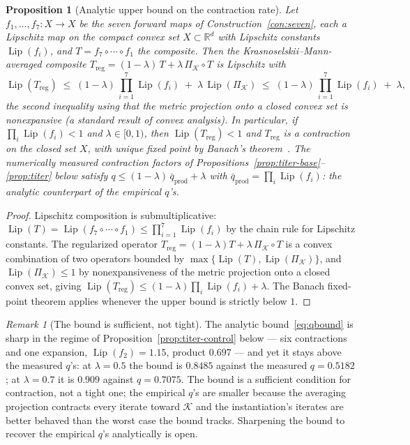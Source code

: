 \documentclass[11pt,a4paper]{article}
\theoremstyle{plain}
\newtheorem{proposition}[theorem]{Proposition}
\theoremstyle{definition}
\theoremstyle{remark}
\newtheorem{remark}[theorem]{Remark}
\newcommand{\RR}{\mathbb{R}}
\DeclareMathOperator{\Lip}{Lip}
\begin{document}
\begin{proposition}[Analytic upper bound on the contraction rate]
\label{prop:qbound}
Let $f_1,\ldots,f_7:X\to X$ be the seven forward maps of
Construction~\ref{con:seven}, each a Lipschitz map on the compact
convex set $X\subset\RR^{d}$ with Lipschitz constants
$\Lip(f_i)$, and $T=f_7\circ\cdots\circ f_1$ the composite. Then the
Krasnoselskii--Mann-averaged composite
$T_{\mathrm{reg}}=(1-\lambda)\,T+\lambda\,\Pi_{\mathcal K}\circ T$
is Lipschitz with
\begin{equation}\label{eq:qbound}
  \Lip(T_{\mathrm{reg}}) \;\leq\; (1-\lambda)\,
  \prod_{i=1}^{7}\Lip(f_i) \;+\; \lambda\,\Lip(\Pi_{\mathcal K})
  \;\leq\; (1-\lambda)\,\prod_{i=1}^{7}\Lip(f_i)\;+\;\lambda,
\end{equation}
the second inequality using that the metric projection onto a
closed convex set is nonexpansive (a standard result of convex
analysis). In particular, if $\prod_i\Lip(f_i)<1$ and
$\lambda\in[0,1)$, then $\Lip(T_{\mathrm{reg}})<1$ and
$T_{\mathrm{reg}}$ is a contraction on the closed set $X$, with
unique fixed point by Banach's theorem~\cite{banach1922}. The
numerically measured contraction factors of
Propositions~\ref{prop:titer-base}--\ref{prop:titer} below
satisfy $q\leq(1-\lambda)\,\bar q_{\mathrm{prod}}+\lambda$ with
$\bar q_{\mathrm{prod}}=\prod_i\Lip(f_i)$: the analytic
counterpart of the empirical $q$'s.
\end{proposition}

\begin{proof}
Lipschitz composition is submultiplicative:
$\Lip(T)=\Lip(f_7\circ\cdots\circ f_1)\leq\prod_{i=1}^{7}\Lip(f_i)
$ by the chain rule for Lipschitz constants. The regularized
operator $T_{\mathrm{reg}}=(1-\lambda)T+\lambda\,
\Pi_{\mathcal K}\!\circ T$ is a convex combination of two
operators bounded by $\max\{\Lip(T),\Lip(\Pi_{\mathcal K})\}$,
and $\Lip(\Pi_{\mathcal K})\leq1$ by nonexpansiveness of the
metric projection onto a closed convex set, giving
$\Lip(T_{\mathrm{reg}})\leq(1-\lambda)\prod_i\Lip(f_i)+\lambda$.
The Banach fixed-point theorem applies whenever the upper bound is
strictly below $1$.
\end{proof}

\begin{remark}[The bound is sufficient, not tight]
\label{rem:qbound-tightness}
The analytic bound~\eqref{eq:qbound} is sharp in the regime of
Proposition~\ref{prop:titer-control} below --- six contractions
and one expansion, $\Lip(f_2)=1.15$, product $0.697$ --- and
yet it stays above the measured $q$'s: at $\lambda=0.5$ the bound
is $0.8485$ against the measured $q=0.5182$; at $\lambda=0.7$ it is
$0.909$ against $q=0.7075$. The bound is a sufficient condition
for contraction, not a tight one; the empirical $q$'s are smaller because the averaging projection
contracts every iterate toward $\mathcal K$ and the instantiation's
iterates are better behaved than the worst case the bound tracks.
Sharpening the bound to recover the empirical $q$'s
analytically is open.
\end{remark}
\end{document}
